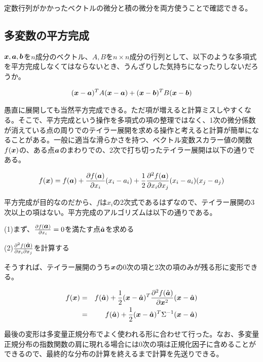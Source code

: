 \documentclass{jarticle}
\def\vec#1{\mbox{\boldmath $#1$}}
\begin{document}
定数行列がかかったベクトルの微分と積の微分を両方使うことで確認できる。


\subsection{多変数の平方完成}
$\vec{x},\vec{a},\vec{b}$を$n$成分のベクトル、$A, B$を$n\times n$成分の行列として、以下のような多項式を平方完成しなくてはならないとき、うんざりした気持ちになったりしないだろうか。

\begin{eqnarray}
(\vec{x}-\vec{a})^T A (\vec{x}-\vec{a}) + (\vec{x}-\vec{b})^T B (\vec{x}-\vec{b}) 
\end{eqnarray}

愚直に展開しても当然平方完成できる。ただ項が増えると計算ミスしやすくなる。そこで、平方完成という操作を多項式の項の整理ではなく、1次の微分係数が消えている点の周りでのテイラー展開を求める操作と考えると計算が簡単になることがある。一般に適当な滑らかさを持つ、ベクトル変数スカラー値の関数$f(\vec{x})$の、ある点$\vec{a}$のまわりでの、2次で打ち切ったテイラー展開は以下の通りである。

\begin{eqnarray}
f(\vec{x})=f(\vec{a})+\frac{\partial f(\vec{a})}{\partial x_i}(x_i -  a_i) + \frac{1}{2}\frac{\partial ^2 f(\vec{a})}{\partial x_i \partial x_j}(x_i -  a_i)(x_j -  a_j) 
\end{eqnarray}

平方完成が目的なのだから、$f$は$x_i$の2次式であるはずなので、テイラー展開の3次以上の項はない。平方完成のアルゴリズムは以下の通りである。

(1)まず、$\frac{\partial f(\vec{a})}{\partial x_i}=0$を満たす点$\hat{\vec{a}}$を求める

(2)$\frac{\partial ^2 f(\hat{\vec{a}})}{\partial x_i \partial x_j}$を計算する

そうすれば、テイラー展開のうち$\vec{x}$の0次の項と2次の項のみが残る形に変形できる。

\begin{eqnarray}
f(\vec{x}) &=& f(\hat{\vec{a}}) + \frac{1}{2} (\vec{x}-\hat{\vec{a}}) ^T \frac{\partial ^2 f(\hat{\vec{a}})}{\partial \vec{x} ^2} (\vec{x}-\hat{\vec{a}}) \\
&=&f(\hat{\vec{a}}) + \frac{1}{2} (\vec{x}-\hat{\vec{a}}) ^T \Sigma ^{-1} (\vec{x}-\hat{\vec{a}})
\end{eqnarray}

最後の変形は多変量正規分布でよく使われる形に合わせて行った。なお、多変量正規分布の指数関数の肩に現れる場合には0次の項は正規化因子に含めることができるので、最終的な分布の計算を終えるまで計算を先送りできる。
\end{document}
